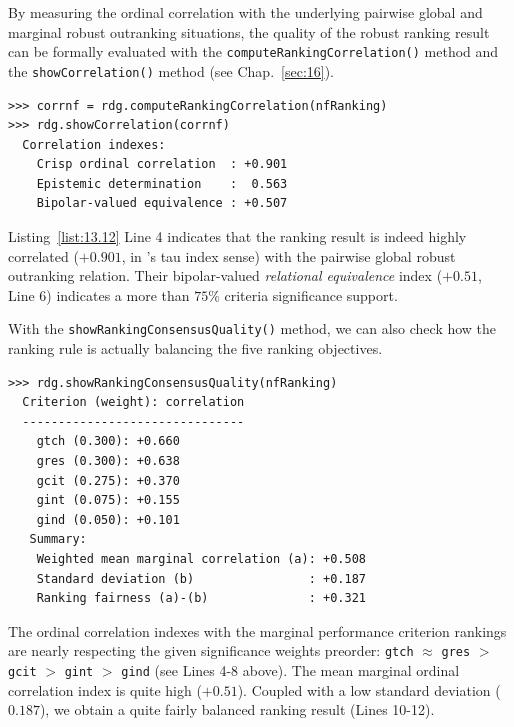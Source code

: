 By measuring the ordinal correlation with the underlying pairwise global and marginal robust outranking situations, the quality of the robust \NetFlows ranking result can be formally evaluated with the \texttt{computeRankingCorrelation()} method and the \texttt{showCorrelation()} method (see Chap.~\ref{sec:16}).
\begin{lstlisting}[caption={Measuring the quality of the \NetFlows ranking result},label=list:13.12]
>>> corrnf = rdg.computeRankingCorrelation(nfRanking)
>>> rdg.showCorrelation(corrnf)   
  Correlation indexes:
    Crisp ordinal correlation  : +0.901
    Epistemic determination    :  0.563
    Bipolar-valued equivalence : +0.507
\end{lstlisting}

Listing~\vref{list:13.12} Line 4 indicates that the \NetFlows ranking result is indeed highly  correlated ($+0.901$, in \Kendall 's tau index sense) with the pairwise global robust outranking relation. Their bipolar-valued \emph{relational equivalence} index ($+0.51$, Line 6) indicates a more than $75\%$ criteria significance support.

With the \texttt{showRankingConsensusQuality()} method,  we can also check how the \NetFlows ranking rule is actually balancing the five ranking objectives.
\begin{lstlisting}[caption={Measuring the consensus quality of the \NetFlows ranking result},label=list:13.13]
>>> rdg.showRankingConsensusQuality(nfRanking)
  Criterion (weight): correlation
  -------------------------------
    gtch (0.300): +0.660
    gres (0.300): +0.638
    gcit (0.275): +0.370
    gint (0.075): +0.155
    gind (0.050): +0.101
   Summary:
    Weighted mean marginal correlation (a): +0.508
    Standard deviation (b)                : +0.187
    Ranking fairness (a)-(b)              : +0.321
\end{lstlisting}

The ordinal correlation indexes with the marginal performance criterion rankings are nearly respecting the given significance weights preorder: \texttt{gtch} $\approx$ \texttt{gres} $>$ \texttt{gcit} $>$ \texttt{gint} $>$ \texttt{gind} (see Lines 4-8 above). The mean marginal ordinal correlation index is quite high ($+0.51$). Coupled with a low standard deviation ($0.187$), we obtain a quite fairly balanced ranking result (Lines 10-12). 

